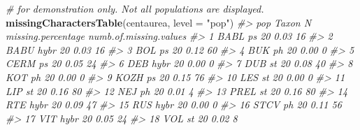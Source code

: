 \documentclass[
]{article}
\newenvironment{Shaded}{\begin{snugshade}}{\end{snugshade}}
\newcommand{\CommentTok}[1]{\textcolor[rgb]{0.56,0.35,0.01}{\textit{#1}}}
\newcommand{\DataTypeTok}[1]{\textcolor[rgb]{0.13,0.29,0.53}{#1}}
\newcommand{\KeywordTok}[1]{\textcolor[rgb]{0.13,0.29,0.53}{\textbf{#1}}}
\newcommand{\NormalTok}[1]{#1}
\newcommand{\StringTok}[1]{\textcolor[rgb]{0.31,0.60,0.02}{#1}}
\begin{document}
\begin{Shaded}
\begin{Highlighting}[]
\CommentTok{# for demonstration only. Not all populations are displayed.}
\KeywordTok{missingCharactersTable}\NormalTok{(centaurea, }\DataTypeTok{level =} \StringTok{"pop"}\NormalTok{)}
\CommentTok{#>     pop Taxon  N missing.percentage numb.of.missing.values}
\CommentTok{#> 1  BABL    ps 20               0.03                     16}
\CommentTok{#> 2  BABU  hybr 20               0.03                     16}
\CommentTok{#> 3   BOL    ps 20               0.12                     60}
\CommentTok{#> 4   BUK    ph 20               0.00                      0}
\CommentTok{#> 5  CERM    ps 20               0.05                     24}
\CommentTok{#> 6   DEB  hybr 20               0.00                      0}
\CommentTok{#> 7   DUB    st 20               0.08                     40}
\CommentTok{#> 8   KOT    ph 20               0.00                      0}
\CommentTok{#> 9  KOZH    ps 20               0.15                     76}
\CommentTok{#> 10  LES    st 20               0.00                      0}
\CommentTok{#> 11  LIP    st 20               0.16                     80}
\CommentTok{#> 12  NEJ    ph 20               0.01                      4}
\CommentTok{#> 13 PREL    st 20               0.16                     80}
\CommentTok{#> 14  RTE  hybr 20               0.09                     47}
\CommentTok{#> 15  RUS  hybr 20               0.00                      0}
\CommentTok{#> 16 STCV    ph 20               0.11                     56}
\CommentTok{#> 17  VIT  hybr 20               0.05                     24}
\CommentTok{#> 18  VOL    st 20               0.02                      8}
\end{Highlighting}
\end{Shaded}
\end{document}
